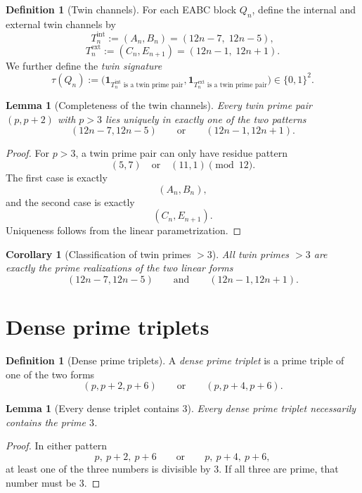 \documentclass[11pt,a4paper]{article}
\newtheorem{lemma}[theorem]{Lemma}
\newtheorem{corollary}[theorem]{Corollary}
\theoremstyle{definition}
\newtheorem{definition}[theorem]{Definition}
\theoremstyle{remark}
\newcommand{\ind}{\mathbf{1}}
\begin{document}
	\begin{definition}[Twin channels]
		For each EABC block \(Q_n\), define the internal and external twin channels by
		\[
		T_n^{\mathrm{int}}:=(A_n,B_n)=(12n-7,\;12n-5),
		\]
		\[
		T_n^{\mathrm{ext}}:=(C_n,E_{n+1})=(12n-1,\;12n+1).
		\]
		We further define the \emph{twin signature}
		\[
		\tau(Q_n):=
		\bigl(
		\ind_{T_n^{\mathrm{int}}\text{ is a twin prime pair}},
		\ind_{T_n^{\mathrm{ext}}\text{ is a twin prime pair}}
		\bigr)\in\{0,1\}^2.
		\]
	\end{definition}
	
	\begin{lemma}[Completeness of the twin channels]
		Every twin prime pair \((p,p+2)\) with \(p>3\) lies uniquely in exactly one of the two patterns
		\[
		(12n-7,12n-5)
		\qquad\text{or}\qquad
		(12n-1,12n+1).
		\]
	\end{lemma}
	
	\begin{proof}
		For \(p>3\), a twin prime pair can only have residue pattern
		\[
		(5,7)\quad\text{or}\quad(11,1)\pmod{12}.
		\]
		The first case is exactly
		\[
		(A_n,B_n),
		\]
		and the second case is exactly
		\[
		(C_n,E_{n+1}).
		\]
		Uniqueness follows from the linear parametrization.
	\end{proof}
	
	\begin{corollary}[Classification of twin primes \(>3\)]
		All twin primes \(>3\) are exactly the prime realizations of the two linear forms
		\[
		(12n-7,12n-5)
		\qquad\text{and}\qquad
		(12n-1,12n+1).
		\]
	\end{corollary}
	
	\section{Dense prime triplets}
	
	\begin{definition}[Dense prime triplets]
		A \emph{dense prime triplet} is a prime triple of one of the two forms
		\[
		(p,p+2,p+6)
		\qquad\text{or}\qquad
		(p,p+4,p+6).
		\]
	\end{definition}
	
	\begin{lemma}[Every dense triplet contains \(3\)]
		Every dense prime triplet necessarily contains the prime \(3\).
	\end{lemma}
	
	\begin{proof}
		In either pattern
		\[
		p,\ p+2,\ p+6
		\qquad\text{or}\qquad
		p,\ p+4,\ p+6,
		\]
		at least one of the three numbers is divisible by \(3\). If all three are prime, that number must be \(3\).
	\end{proof}
	
\end{document}

